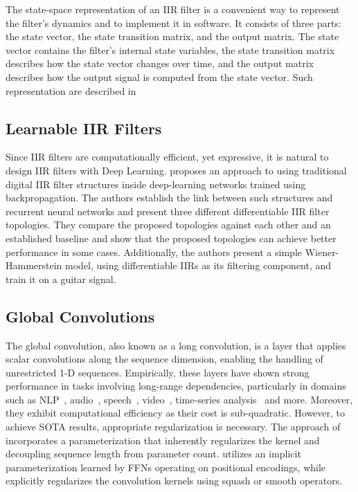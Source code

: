 \documentclass[11pt]{article}
\begin{document}
The state-space representation of an IIR filter is a convenient way to represent the filter's dynamics and to implement it in software. It consists of three parts: the state vector, the state transition matrix, and the output matrix. The state vector contains the filter's internal state variables, the state transition matrix describes how the state vector changes over time, and the output matrix describes how the output signal is computed from the state vector. Such representation are described in \cite{zhang2023effectively}

\subsection{Learnable IIR Filters}
Since IIR filters are computationally efficient, yet expressive, it is natural to design IIR filters with Deep Learning.
 \cite{kuznetsov2020differentiable} proposes an approach to using traditional digital IIR filter structures inside deep-learning networks trained using backpropagation. The authors establish the link between such structures and recurrent neural networks and present three different differentiable IIR filter topologies. They compare the proposed topologies against each other and an established baseline and show that the proposed topologies can achieve better performance in some cases. Additionally, the authors present a simple Wiener-Hammerstein model, using differentiable IIRs as its filtering component, and train it on a guitar signal. 

\subsection{Global Convolutions}
The global convolution, also known as a long convolution, is a layer that applies scalar convolutions along the sequence dimension, enabling the handling of unrestricted 1-D sequences. Empirically, these layers have shown strong performance in tasks involving long-range dependencies, particularly in domains such as NLP~\cite{dao2022hungry,mehta2022long,wang2022pretraining}, audio~\cite{goel2022s}, speech~\cite{saon2023diagonal}, video~\cite{islam2022efficient,wang2023selective}, time-series analysis~\cite{zhang2023effectively} and more. Moreover, they exhibit computational efficiency as their cost is sub-quadratic. However, to achieve SOTA results, appropriate regularization is necessary. The approach of \cite{gu2021combining,gu2021efficiently,ma2022mega,li2022makes} incorporates a parameterization that inherently regularizes the kernel and decoupling sequence length from parameter count. \cite{romero2021ckconv,poli2023hyena} utilizes an implicit parameterization learned by FFNs operating on positional encodings, while ~\cite{fu2023simple} explicitly regularizes the convolution kernels using squash or smooth operators. 
\end{document}
